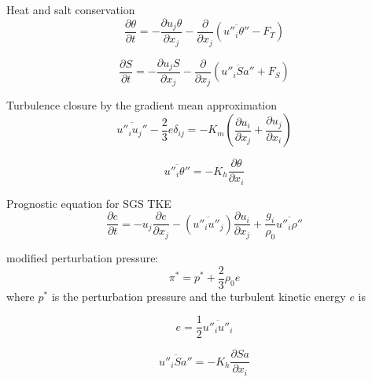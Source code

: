 \documentclass[letterpaper,10pt]{report}
\begin{document}
	Heat and salt conservation
	\begin{equation} \label{eq:ptprog}
	\frac{\partial \theta}{\partial t} = -\frac{\partial u_j \theta}{\partial x_j} - \frac{\partial}{\partial x_j}(\overline{u''_i \theta''} - F_T)
	\end{equation}
	
	\begin{equation} \label{eq:saprog}
	\frac{\partial S}{\partial t} = -\frac{\partial u_j S}{\partial x_j} - \frac{\partial}{\partial x_j}(\overline{u''_i Sa''} + F_S)
	\end{equation}
	
	Turbulence closure by the gradient mean approximation
	\begin{equation} \label{eq:momdiff}
	\overline{u''_i u_j''} - \frac{2}{3}e \delta_{ij} = -K_m(\frac{\partial u_i}{\partial x_j} + \frac{\partial u_j}{\partial x_i})
	\end{equation}
	
	\begin{equation} \label{eq:ptdiff}
	\overline{u''_i \theta''} = -K_h \frac{\partial \theta}{\partial x_i}
	\end{equation}
	
	
	Prognostic equation for SGS TKE
	\begin{equation} \label{eq:eprog}
	\frac{\partial e}{\partial t} = 
	-u_j \frac{\partial e}{\partial x_j} 
	- (\overline{u''_i u''_j})\frac{\partial u_i}{\partial x_j} + \frac{g_i}{\rho_0}\overline{u''_i \rho''}
	\end{equation}
	
	modified perturbation pressure:
	\begin{equation} \label{eq:pi}
	\pi^* = p^* + \frac{2}{3}\rho_0 e
	\end{equation}
	where $p^*$ is the perturbation pressure and the turbulent kinetic energy $e$ is

	\begin{equation} \label{eq:e}
	e = \frac{1}{2}\overline{u''_i u''_i}
	\end{equation}
	
	\begin{equation} \label{eq:sadiff}
	\overline{u''_i Sa''} = -K_h \frac{\partial Sa}{\partial x_i}
	\end{equation}
	
\end{document}
